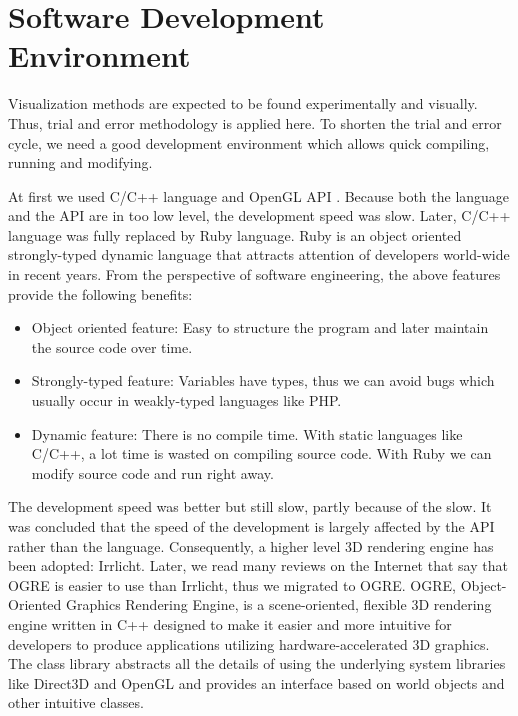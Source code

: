 
\section{Software Development Environment}

Visualization methods are expected to be found experimentally and visually. Thus, trial and error methodology is applied here. To shorten the trial and error cycle, we need a good development environment which allows quick compiling, running and modifying.

At first we used C/C++ language and OpenGL API \cite{Reference10}. Because both the language and the API are in too low level, the development speed was slow. Later, C/C++ language was fully replaced by Ruby language. Ruby is an object oriented strongly-typed dynamic language that attracts attention of developers world-wide in recent years. From the perspective of software engineering, the above features provide the following benefits:

\begin{itemize}
	\item Object oriented feature: Easy to structure the program and later maintain the source code over time.
	\item Strongly-typed feature: Variables have types, thus we can avoid bugs which usually occur in weakly-typed languages like PHP.
	\item Dynamic feature: There is no compile time. With static languages like C/C++, a lot time is wasted on compiling source code. With Ruby we can modify source code and run right away.
\end{itemize}

The development speed was better but still slow, partly because of the slow. It was concluded that the speed of the development is largely affected by the API rather than the language. Consequently, a higher level 3D rendering engine has been adopted: Irrlicht. Later, we read many reviews on the Internet that say that OGRE \cite{Reference11} is easier to use than Irrlicht, thus we migrated to OGRE. OGRE, Object-Oriented Graphics Rendering Engine, is a scene-oriented, flexible 3D rendering engine written in C++ designed to make it easier and more intuitive for developers to produce applications utilizing hardware-accelerated 3D graphics. The class library abstracts all the details of using the underlying system libraries like Direct3D and OpenGL and provides an interface based on world objects and other intuitive classes.

